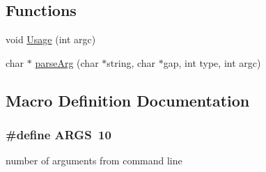 \subsection*{Functions}
\begin{DoxyCompactItemize}
\item 
void \hyperlink{opt__jr__parameters__helper_8hh_a071ae424a27c67719a722878e9f2ab9a}{Usage} (int argc)
\item 
char $\ast$ \hyperlink{opt__jr__parameters__helper_8hh_ac15f519b8531039fbfc3380f9de89580}{parse\-Arg} (char $\ast$string, char $\ast$gap, int type, int argc)
\end{DoxyCompactItemize}


\subsection{Macro Definition Documentation}
\hypertarget{opt__jr__parameters__helper_8hh_aff1b09d6630c6c0942f78171e74c1b9d}{
\subsubsection[{A\-R\-G\-S}]{\setlength{\rightskip}{0pt plus 5cm}\#define A\-R\-G\-S~10}}\label{opt__jr__parameters__helper_8hh_aff1b09d6630c6c0942f78171e74c1b9d}


number of arguments from command line 

